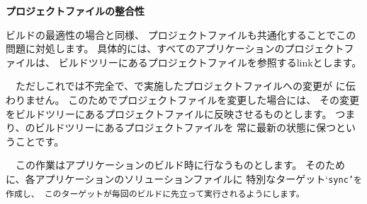 \medskip
\noindent
\bf{\KLUDGE プロジェクトファイルの整合性}
\begin{narrow}[20pt]
	\KLUDGE ビルドの最適性の場合と同様、
	\KLUDGE プロジェクトファイルも共通化することでこの問題に対処します。
	\KLUDGE 具体的には、すべてのアプリケーションのプロジェクトファイルは、
	\SprLib \KLUDGE ビルドツリーにあるプロジェクトファイルを参照するlink\KLUDGE とします。

	\KLUDGE 　ただしこれでは不完全で、\KLUDGE で実施したプロジェクトファイルへの変更が
	\KLUDGE に伝わりません。
	\KLUDGE このため\KLUDGE でプロジェクトファイルを変更した場合には、
	\KLUDGE その変更を\SprLib \KLUDGE ビルドツリーにあるプロジェクトファイルに反映させるものとします。
	\KLUDGE つまり、\SprLib \KLUDGE のビルドツリーにあるプロジェクトファイルを
	\KLUDGE 常に最新の状態に保つということです。

	\KLUDGE 　この作業はアプリケーションのビルド時に行なうものとします。
	\KLUDGE そのために、各アプリケーションのソリューションファイルに
	\KLUDGE 特別なターゲット`\tt{sync}'\KLUDGE を作成し、
	\KLUDGE このターゲットが毎回のビルドに先立って実行されるようにします。


\end{narrow}
